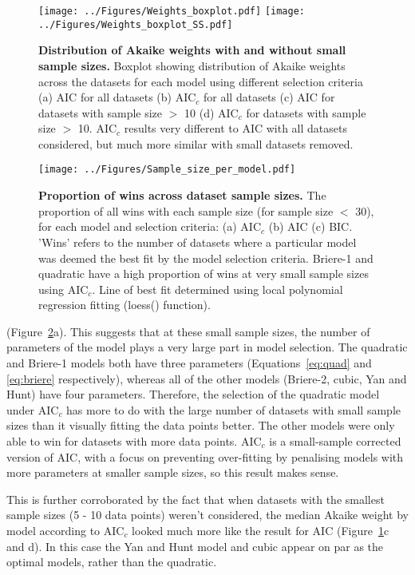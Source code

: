 \documentclass[11pt, a4paper]{article}
\begin{document}
\begin{figure} [H]
	\texttt{[image: ../Figures/Weights\_boxplot.pdf]}
	\texttt{[image: ../Figures/Weights\_boxplot\_SS.pdf]}
	\caption{\label{fig:weights} \textbf{Distribution of Akaike weights with and without small sample sizes.} Boxplot showing distribution of Akaike weights across the datasets for each model using different selection criteria (a) AIC for all datasets (b) AIC$_c$ for all datasets (c) AIC for datasets with sample size $>$ 10 (d) AIC$_c$ for datasets with sample size $>$ 10. AIC$_c$ results very different to AIC with all datasets considered, but much more similar with small datasets removed.}
\end{figure}

\begin{figure} [H]
	\texttt{[image: ../Figures/Sample\_size\_per\_model.pdf]}
	\caption{\label{fig:sample_size_line} \textbf{Proportion of wins across dataset sample sizes.} The proportion of all wins with each sample size (for sample size $<$ 30), for each model and selection criteria: (a) AIC$_c$ (b) AIC (c) BIC. 'Wins' refers to the number of datasets where a particular model was deemed the best fit by the model selection criteria. Briere-1 and quadratic have a high proportion of wins at very small sample sizes using AIC$_c$. Line of best fit determined using local polynomial regression fitting (loess() function).}
\end{figure}
\bigskip

(Figure~\ref{fig:sample_size_line}a). This suggests that at these small sample sizes, the number of parameters of the model plays a very large part in model selection. The quadratic and Briere-1 models both have three parameters (Equations~\ref{eq:quad} and \ref{eq:briere} respectively), whereas all of the other models (Briere-2, cubic, Yan and Hunt) have four parameters. Therefore, the selection of the quadratic model under AIC$_c$ has more to do with the large number of datasets with small sample sizes than it visually fitting the data points better. The other models were only able to win for datasets with more data points. AIC$_c$ is a small-sample corrected version of AIC, with a focus on preventing over-fitting by penalising models with more parameters at smaller sample sizes, so this result makes sense.

This is further corroborated by the fact that when datasets with the smallest sample sizes (5 - 10 data points) weren't considered, the median Akaike weight by model according to AIC$_c$ looked much more like the result for AIC (Figure~\ref{fig:weights}c and d). In this case the Yan and Hunt model and cubic appear on par as the optimal models, rather than the quadratic. 
\end{document}
